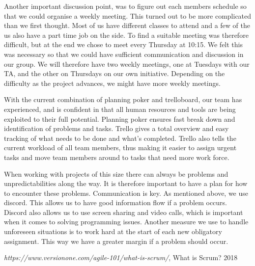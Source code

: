 \documentclass{article}
\begin{document}
Another important discussion point, was to figure out each members schedule so that we could organise a weekly meeting. This turned out to be more complicated than we first thought. Most of us have different classes to attend and a few of the us also have a part time job on the side. To find a suitable meeting was therefore  difficult, but at the end we chose to meet every Thursday at 10:15. We felt this was necessary so that we could have sufficient communication and discussion in our group. We will therefore have two weekly meetings, one at Tuesdays with our TA, and the other on Thursdays on our own initiative. Depending on the difficulty as the project advances, we might have more weekly meetings.  \newline

With the current combination of planning poker and trelloboard, our team has experienced, and is confident in that all human resources and tools are being exploited to their full potential. Planning poker ensures fast break down and identification of problems and tasks. Trello gives a total overview and easy tracking of what needs to be done and what's completed. Trello also tells the current workload of all team members, thus making it easier to assign urgent tasks and move team members around to tasks that need more work force. \newline

When working with projects of this size there can always be problems and unpredictabilities along the way. It is therefore important to have a plan for how to encounter these problems. Communication is key. As mentioned above, we use discord. This allows us to have good information flow if a problem occurs. Discord also allows us to use screen sharing and video calls, which is important when it comes to solving programming issues. Another measure we use to handle unforeseen situations is to work hard at the start of each new obligatory assignment. This way we have a greater margin if a problem should occur. 
\newline


\begin{thebibliography}{9}
 
  \textit{https://www.versionone.com/agile-101/what-is-scrum/},
  What is Scrum?
  2018
  

\end{thebibliography}
\end{document}
